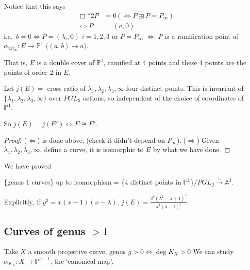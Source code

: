 \documentclass{article}
\newcommand{\A}{\mathbb{A}}
\newcommand{\proj}{\mathbb{P}}
\begin{document}
Notice that this says
\begin{align}
    \Box*{2}P &= 0 (\iff P \boxplus P = P_\infty) \\
    \iff P &= (a, 0)
\end{align}
i.e.\ $b=0 \iff P = (\lambda_i, 0)$ $i=1,2,3$ or $P = P_\infty$ $\iff$ $P$ is a ramification point of $\alpha_{2 P_\infty}: E \to \proj^1$ ($(a, b) \mapsto a$).

That is, $E$ is a double cover of $\proj^1$, ramified at 4 points and these 4 points are the points of order 2 in $E$.

Let $j(E) =$ cross ratio of $\lambda_1, \lambda_2, \lambda_3, \infty$ four distinct points. This is invariant of $\{\lambda_1, \lambda_2, \lambda_3, \infty\}$ over $PGL_2$ actions, so independent of the choice of coordinates of $\proj^1$.

So $j(E) = j(E') \iff E \cong E'$.
\begin{proof}
    ($\Leftarrow$) is done above, (check it didn't depend on $P_\infty$).
    ($\Rightarrow$) Given $\lambda_1, \lambda_2, \lambda_3, \infty$, define a curve, it is isomorphic to $E$ by what we have done.
\end{proof}

We have proved
\begin{cor}
    \{genus 1 curves\} up to isomorphism = \{4 distinct points in $\proj^1$\}$/PGL_2 \xrightarrow{\sim} \A^1$.
\end{cor}
Explicitly, if $y^2 = x(x-1)(x-\lambda)$, $j(E) = \frac{2^8 (\lambda^2 - \lambda + 1)^3}{\lambda^2 (\lambda-1)^2}$.

\subsection{Curves of genus $>1$}
Take $X$ a smooth projective curve, genus $g > 0 \iff \deg K_X > 0$
We can study $\alpha_{K_X}: X \to \proj^{g - 1}$, the `canonical map'.
\end{document}
